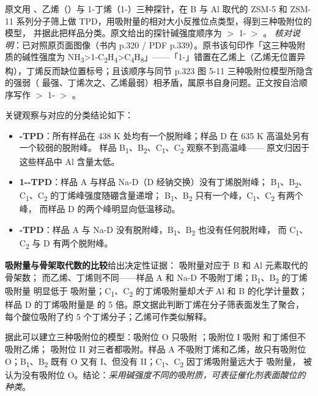 \begin{dataflow}
原文用 、乙烯（）与 1-丁烯（1-）三种探针，在 B 与 Al 取代的 ZSM-5
和 ZSM-11 系列分子筛上做 TPD，用吸附量的相对大小反推位点类型，得到三种吸附位的模型，
并据此把样品分类。原文给出的探针碱强度顺序为  $>$ 1- $>$ 。
\emph{核对说明}：已对照原页面图像（书内 p.320 / PDF p.339）。原书该句印作「这三种吸附质的碱性强度为 NH\textsubscript{3}>1-C\textsubscript{2}H\textsubscript{4}>C\textsubscript{4}H\textsubscript{8}」——「1-」错置在乙烯上（乙烯无位置异构），丁烯反而缺位置标号；且该顺序与同节 p.323 图 5-11 三种吸附位模型所隐含的强弱（ 最强、丁烯次之、乙烯最弱）相矛盾，属原书自身问题。正文按自洽顺序写作  $>$ 1- $>$ 。

关键观察与对应的分类结论如下：

\begin{itemize}
  \item \textbf{-TPD}：所有样品在 438 K 处均有一个脱附峰；样品 D 在 635 K 高温处另有一个较弱的脱附峰。
        样品 B\textsubscript{1}、B\textsubscript{2}、C\textsubscript{1}、C\textsubscript{2} 观察不到高温峰——
        原文归因于这些样品中 Al 含量太低。
  \item \textbf{1--TPD}：样品 A 与样品 Na-D（D 经钠交换）没有丁烯脱附峰；
        B\textsubscript{1}、B\textsubscript{2}、C\textsubscript{1}、C\textsubscript{2} 的丁烯峰强度随硼含量递增；
        B\textsubscript{1}、B\textsubscript{2} 只有一个峰，C\textsubscript{1}、C\textsubscript{2} 有两个峰，
        而样品 D 的两个峰明显向低温移动。
  \item \textbf{-TPD}：样品 A 与 Na-D 没有脱附峰，B\textsubscript{1}、B\textsubscript{2} 也没有任何脱附峰，
        而 C\textsubscript{1}、C\textsubscript{2} 与 D 有两个脱附峰。
\end{itemize}

\textbf{吸附量与骨架取代数的比较}给出决定性证据： 吸附量对应于 B 和 Al 元素取代的骨架数；
而乙烯、丁烯则不同——样品 A 和 Na-D 不吸附丁烯；B\textsubscript{1}、B\textsubscript{2} 的丁烯吸附量
明显低于  吸附量；C\textsubscript{1}、C\textsubscript{2} 的丁烯吸附量却\emph{大于} Al 和 B 的化学计量数；
样品 D 的丁烯吸附量是  的 5 倍。原文据此判断丁烯在分子筛表面发生了聚合，
每个酸位吸附了约 5 个丁烯分子；乙烯可作类似解释。

据此可以建立三种吸附位的模型：吸附位 O 只吸附 ；吸附位 I 吸附  和丁烯但不吸附乙烯；
吸附位 II 对三者都吸附。样品 A 不吸附丁烯和乙烯，故只有吸附位 O；B\textsubscript{1}、B\textsubscript{2}
既有 O 又有 I、但没有 II；C\textsubscript{1}、C\textsubscript{2} 因丁烯吸附量远大于  吸附量，
被认为没有吸附位 O。结论：\emph{采用碱强度不同的吸附质，可表征催化剂表面酸位的种类}。
\end{dataflow}

